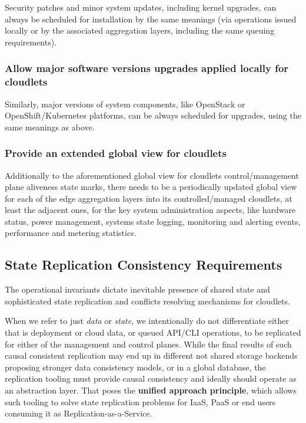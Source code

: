 \documentclass[conference]{IEEEtran}
\begin{document}
Security patches and minor system updates, including kernel upgrades, can
always be scheduled for installation by the same meanings (via operations
issued locally or by the associated aggregation layers, including the same
queuing requirements).

\subsubsection{Allow major software versions upgrades applied locally for
cloudlets}

Similarly, major versions of system components, like OpenStack or
OpenShift/Kubernetes platforms, can be always scheduled for upgrades, using the
same meanings as above.

\subsubsection{Provide an extended global view for cloudlets}

Additionally to the aforementioned global view for cloudlets control/management
plane aliveness state marks, there needs to be a periodically updated global
view for each of the edge aggregation layers into its controlled/managed
cloudlets, at least the adjacent ones, for the key system administration
aspects, like hardware status, power management, systems state logging,
monitoring and alerting events, performance and metering statistics.

\subsection{State Replication Consistency Requirements}

The operational invariants dictate inevitable presence of shared state and
sophisticated state replication and conflicts resolving
mechanisms for cloudlets.

When we refer to just \textit{data} or \textit{state}, we intentionally do not
differentiate either that is deployment or cloud data, or queued API/CLI
operations, to be replicated for either of the management and control planes.
While the final results of such causal consistent replication may end up in
different not shared storage backends proposing stronger data consistency
models, or in a global database, the replication tooling must provide causal
consistency and ideally should operate as an abstraction layer. That poses the
\textbf{unified approach principle}, which allows such tooling to solve state
replication problems for IaaS, PaaS or end users consuming it as
Replication-as-a-Service.
\end{document}
